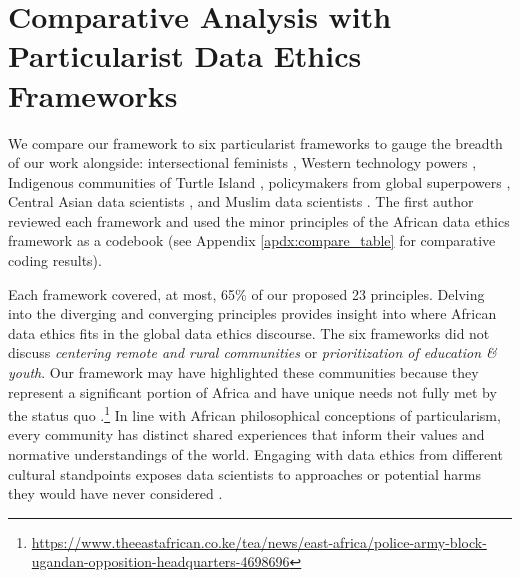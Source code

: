 \section{Comparative Analysis with Particularist Data Ethics Frameworks}
\label{sec:compare}
We compare our framework to six particularist frameworks to gauge the breadth of our work alongside:
intersectional feminists \cite{klein2024data}, Western technology powers \cite{floridi2018ai4people}, Indigenous communities of Turtle Island \cite{carroll2021operationalizing}, policymakers from global superpowers \cite{jobin2019global}, Central Asian data scientists \cite{younas2024proposing}, and Muslim data scientists \cite{raquib2022islamic}. The first author reviewed each framework and used the minor principles of the African data ethics framework as a codebook (see Appendix \ref{apdx:compare_table} for comparative coding results).

Each framework covered, at most, 65\% of our proposed 23 principles. Delving into the diverging and converging principles provides insight into where African data ethics fits in the global data ethics discourse. 
The six frameworks did not discuss \textit{centering remote and rural communities} or \textit{prioritization of education \& youth}. 
Our framework may have highlighted these communities because they represent a significant portion of Africa and have unique needs not fully met by the status quo \cite{sanny2023africas, barrett2017structural}.\footnote{\url{https://www.theeastafrican.co.ke/tea/news/east-africa/police-army-block-ugandan-opposition-headquarters-4698696}} 
In line with African philosophical conceptions of particularism, every community has distinct shared experiences that inform their values and normative understandings of the world. Engaging with data ethics from different cultural standpoints exposes data scientists to approaches or potential harms they would have never considered \cite{adamu2021rethinking}.

